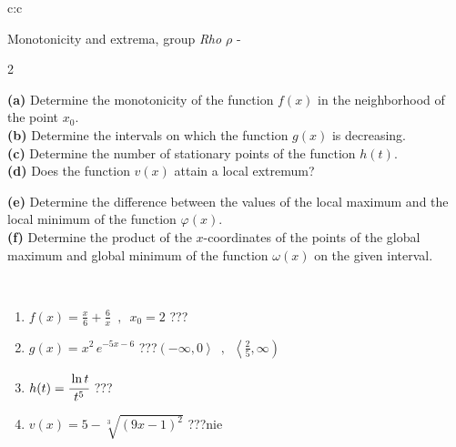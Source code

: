 \documentclass[10pt]{report}
\begin{document}
\begin{tabular}{c:c}
\begin{minipage}[c][104.5mm][t]{0.5\linewidth}
\begin{center}
\vspace{5mm}
{\huge Monotonicity and extrema, group \textit{Rho $\rho$} -}\\[5mm]
\begin{minipage}{0.95\linewidth}
\begin{center}
{\small \begin{multicols}{2} \raggedright
\textbf{(a)} Determine the monotonicity of the function \(f(x)\) in the neighborhood of the point \(x_0\). \\[1mm]
\textbf{(b)} Determine the intervals on which the function \(g(x)\) is decreasing. \\[1mm]
\textbf{(c)} Determine the number of stationary points of the function \(h(t)\). \\[1mm]
\textbf{(d)} Does the function \(v(x)\) attain a local extremum? \par \columnbreak
\textbf{(e)} Determine the difference between the values of the local maximum and the local minimum of the function \(\varphi(x)\). \\[1mm]
\textbf{(f)} Determine the product of the \(x\)-coordinates of the points of the global maximum and global minimum of the function \(\omega(x)\) on the given interval. \\[1mm]
\end{multicols}
}
\end{center}
\end{minipage}
\\[1mm]
\begin{minipage}{0.79\linewidth}
\begin{center}
\begin{varwidth}{\linewidth}
\setlength{\itemsep}{0pt}
\begin{enumerate}
\normalsize
\item $f(x)=\frac{x}{6}+\frac{6}{x} \enspace , \enspace x_0=2$\quad \dotfill\; ???\;\dotfill \quad {}
\item $g(x)=x^2\, e^{-5x-6}$\quad \dotfill\; ???\;\dotfill \quad $\left(-\infty , 0\right\rangle\enspace , \enspace \left\langle\frac{2}{5} , \infty\right)$
\item $h(t)=\cfrac{\ln t}{t^5}$\quad \dotfill\; ???\;\dotfill {}
\item $v(x)=5-\sqrt[3]{(9x-1)^2}$\quad \dotfill\; ???\;\dotfill \quad $\text{nie}$

\end{enumerate}
\end{varwidth}
\end{center}
\end{minipage}
\end{center}
\end{minipage}
\end{tabular}
\end{document}
